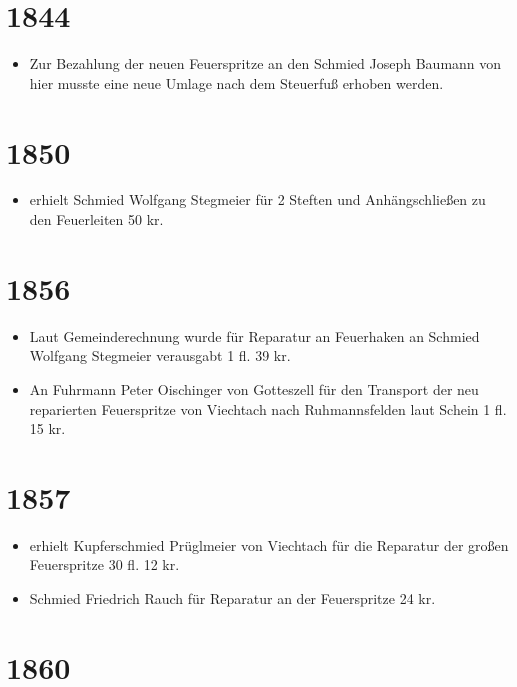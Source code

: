 \documentclass[12pt,a4paper]{book}
\begin{document}
\section*{1844}

\begin{itemize}
\item Zur Bezahlung der neuen Feuerspritze an den Schmied Joseph Baumann
von hier musste eine neue Umlage nach dem Steuerfuß erhoben werden.
\end{itemize}

\section*{1850}

\begin{itemize}
\item erhielt Schmied Wolfgang Stegmeier für 2 Steften und
Anhängschließen zu den Feuerleiten 50 kr.
\end{itemize}

\section*{1856}

\begin{itemize}
\item Laut Gemeinderechnung wurde für Reparatur an Feuerhaken an Schmied
Wolfgang Stegmeier verausgabt 1 fl. 39 kr.

\item An Fuhrmann Peter Oischinger von Gotteszell für den Transport der
neu reparierten Feuerspritze von Viechtach nach Ruhmannsfelden laut
Schein 1 fl. 15 kr.
\end{itemize}

\section*{1857}

\begin{itemize}
\item erhielt Kupferschmied Prüglmeier von Viechtach für die Reparatur
der großen Feuerspritze 30 fl. 12 kr.

\item Schmied Friedrich Rauch für Reparatur an der Feuerspritze 24 kr.
\end{itemize}

\section*{1860}
\end{document}
